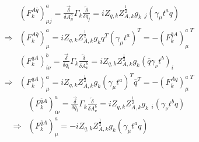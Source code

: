 \documentclass[UTF8]{article}
\begin{document}
\begin{equation}
\begin{split}
	&(F^{A\bar{q}}_k)^a_{\mu j}=\frac{\overrightarrow{\delta}}{\delta A^a_\mu}\Gamma_k \frac{\overleftarrow{\delta}}{\delta \bar{q}_j}=iZ_{q,k}Z^{\frac{1}{2}}_{A,k}g_k \,\,_{j}(\gamma_\mu t^a q)\\
	\Longrightarrow&(F^{A\bar{q}}_k)^a_\mu=iZ_{q,k}Z^{\frac{1}{2}}_{A,k}g_k q^T (\gamma_\mu t^a)^T=-(F^{\bar{q}A}_k)^{a\,\,T}_\mu
\end{split}
\end{equation}
\begin{equation}
\begin{split}
	&(F^{qA}_k)^b_{i\nu}=\frac{\overrightarrow{\delta}}{\delta q_i}\Gamma_k\frac{\overleftarrow{\delta}}{\delta A^b_\nu}=iZ_{q,k}Z^{\frac{1}{2}}_{A,k}g_k (\bar{q}\gamma_\nu t^b)_i\\
	\Longrightarrow&(F^{qA}_k)^a_\mu=iZ_{q,k}Z^{\frac{1}{2}}_{A,k}g_k(\gamma_\mu t^a)^T \bar{q}^T=-(F^{Aq}_{k})^{a\,\,T}_\mu
\end{split}
\end{equation}
\begin{equation}
\begin{split}
	&(F^{\bar{q}A}_k)^a_{i\nu}=\frac{\overrightarrow{\delta}}{\delta \bar{q}_i}\Gamma_k \frac{\overleftarrow{\delta}}{\delta A^b_\nu}=iZ_{q,k}Z^{\frac{1}{2}}_{A,k}g_k \,\,_{i}(\gamma_\nu t^b q)\\
	\Longrightarrow&(F^{\bar{q}A}_k)^a_\mu=-iZ_{q,k}Z^{\frac{1}{2}}_{A,k}g_k (\gamma_\mu t^a q)
\end{split}
\end{equation}
\end{document}
